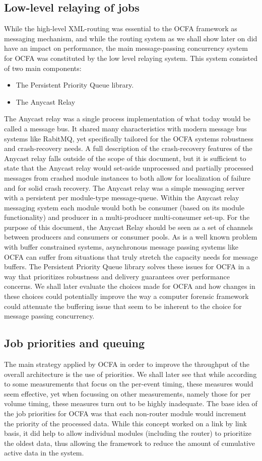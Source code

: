 \subsection{Low-level relaying of jobs}
While the high-level XML-routing was essential to the OCFA framework as messaging mechanism, and while the routing system as we shall show later on did have an impact on performance, the main message-passing concurrency system for OCFA was constituted by the low level relaying system. This system consisted of two main components:
\begin{itemize}
\item The Persistent Priority Queue library.
\item The Anycast Relay
\end{itemize}
The Anycast relay was a single process implementation of what today would be called a message bus. It shared many characteristics with modern message bus systems like RabitMQ, yet specifically tailored for the OCFA systems robustness and crash-recovery needs. A full description of the crash-recovery features of the Anycast relay falls outside of the scope of this document, but it is sufficient to state that the Anycast relay would set-aside unprocessed and partially processed messages from crashed module instances to both allow for localization of failure and for solid crash recovery. The Anycast relay was a simple messaging server with a persistent per module-type message-queue. Within the 
Anycast relay messaging system each module would both be consumer (based on its module functionality) and producer in a multi-producer multi-consumer set-up. 
For the purpose of this document, the Anycast Relay should be seen as a set of channels between producers and consumers or consumer pools. As is a well known problem with buffer constrained systems, asynchronous message passing systems like OCFA can suffer from situations that truly stretch the capacity needs for message buffers. The Persistent Priority Queue library solves these issues for OCFA in a way that prioritizes robustness and delivery guarantees over performance concerns. We shall later evaluate the choices made for OCFA and how changes in these choices could potentially improve the way a computer forensic framework could attenuate the buffering issue that seem to be inherent to the choice for message passing concurrency. 
\subsection{Job priorities and queuing}
The main strategy applied by OCFA in order to improve the throughput of the overall architecture is the use of priorities. We shall later see that while according to some measurements that focus on the per-event timing, these measures would seem effective, yet when focussing on other measurements, namely those for per volume timing, these measures turn out to be highly inadequate. The base idea of the job priorities for OCFA was that each non-router module would increment the priority of the processed data. While this concept worked on a link by link basis, it did help to allow individual modules (including the router) to prioritize the oldest data, thus allowing the framework to reduce the amount of cumulative active data in the system. 
